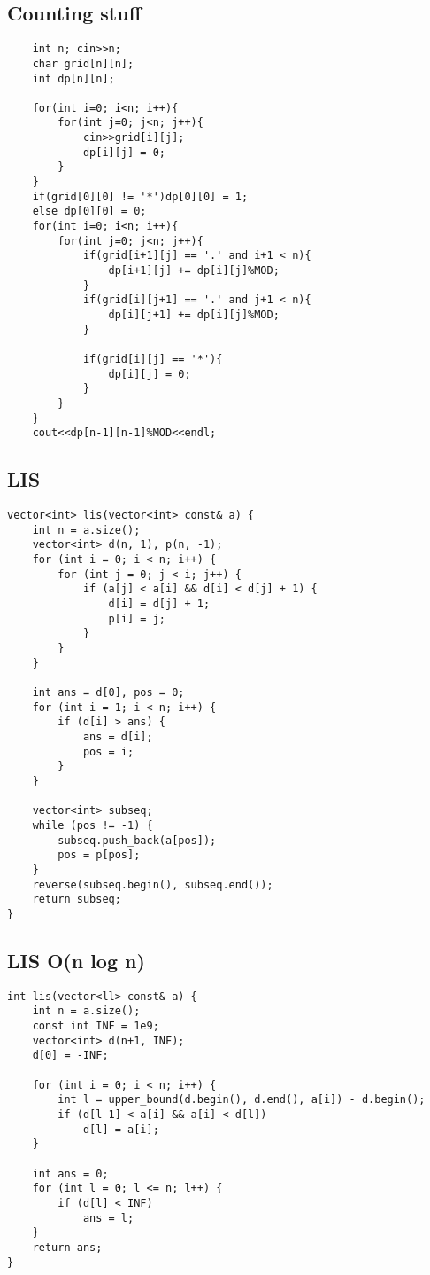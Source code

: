 \documentclass{article}
\begin{document}
\subsection{Counting stuff}
\begin{lstlisting}
    int n; cin>>n;
    char grid[n][n];
    int dp[n][n];
    
    for(int i=0; i<n; i++){
        for(int j=0; j<n; j++){
            cin>>grid[i][j];
            dp[i][j] = 0;
        }
    }
    if(grid[0][0] != '*')dp[0][0] = 1;
    else dp[0][0] = 0;
    for(int i=0; i<n; i++){
        for(int j=0; j<n; j++){
            if(grid[i+1][j] == '.' and i+1 < n){
                dp[i+1][j] += dp[i][j]%MOD;
            }   
            if(grid[i][j+1] == '.' and j+1 < n){
                dp[i][j+1] += dp[i][j]%MOD;
            }

            if(grid[i][j] == '*'){
                dp[i][j] = 0;
            }
        }
    }
    cout<<dp[n-1][n-1]%MOD<<endl;
\end{lstlisting}
\subsection{LIS}
\begin{lstlisting}
vector<int> lis(vector<int> const& a) {
    int n = a.size();
    vector<int> d(n, 1), p(n, -1);
    for (int i = 0; i < n; i++) {
        for (int j = 0; j < i; j++) {
            if (a[j] < a[i] && d[i] < d[j] + 1) {
                d[i] = d[j] + 1;
                p[i] = j;
            }
        }
    }

    int ans = d[0], pos = 0;
    for (int i = 1; i < n; i++) {
        if (d[i] > ans) {
            ans = d[i];
            pos = i;
        }
    }

    vector<int> subseq;
    while (pos != -1) {
        subseq.push_back(a[pos]);
        pos = p[pos];
    }
    reverse(subseq.begin(), subseq.end());
    return subseq;
}
\end{lstlisting}
\subsection{LIS O(n log n)}
\begin{lstlisting}
int lis(vector<ll> const& a) {
    int n = a.size();
    const int INF = 1e9;
    vector<int> d(n+1, INF);
    d[0] = -INF;

    for (int i = 0; i < n; i++) {
        int l = upper_bound(d.begin(), d.end(), a[i]) - d.begin();
        if (d[l-1] < a[i] && a[i] < d[l])
            d[l] = a[i];
    }

    int ans = 0;
    for (int l = 0; l <= n; l++) {
        if (d[l] < INF)
            ans = l;
    }
    return ans;
}
\end{lstlisting}
\end{document}
